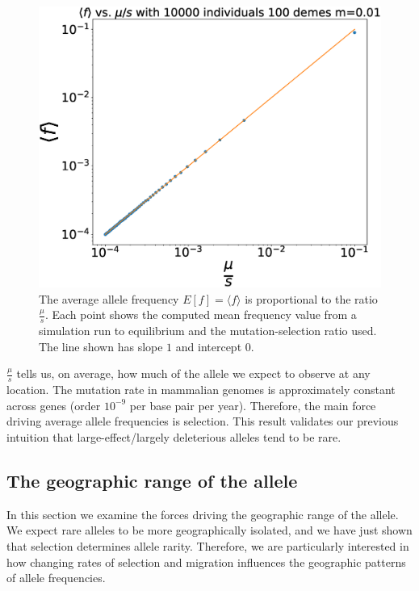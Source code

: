 \begin{figure}[H]
    \centering
    \includegraphics[scale=0.4]{img/fig1.eps}
    \caption{The average allele frequency $E[f] = \langle f \rangle$ is proportional to the ratio $\frac{\mu}{s}$. Each point shows the computed mean frequency value from a simulation run to equilibrium and the mutation-selection ratio used. The line shown has slope $1$ and intercept $0$. }
    \label{fig:avg_freq}
\end{figure}

$\frac{\mu}{s}$ tells us, on average, how much of the allele we expect to observe at any location. The mutation rate in mammalian genomes is approximately constant across genes (order $10^{-9}$ per base pair per year). \cite{kumar_mutation_2002} \cite{scally_mutation_2016} Therefore, the main force driving average allele frequencies is selection. This result validates our previous intuition that large-effect/largely deleterious alleles tend to be rare.

\newpage
\subsection{The geographic range of the allele}
In this section we examine the forces driving the geographic range of the allele. We expect rare alleles to be more geographically isolated, and we have just shown that selection determines allele rarity. Therefore, we are particularly interested in how changing rates of selection and migration influences the geographic patterns of allele frequencies. 


